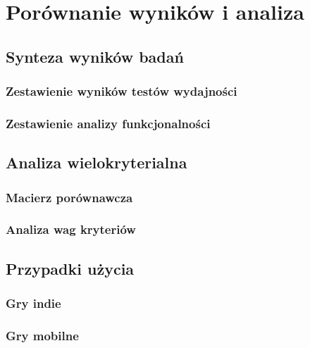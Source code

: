 \clearpage
\section{Porównanie wyników i analiza}

\subsection{Synteza wyników badań}
\subsubsection{Zestawienie wyników testów wydajności}

\subsubsection{Zestawienie analizy funkcjonalności}

\subsection{Analiza wielokryterialna}
\subsubsection{Macierz porównawcza}

\subsubsection{Analiza wag kryteriów}

\subsection{Przypadki użycia}
\subsubsection{Gry indie}

\subsubsection{Gry mobilne}

